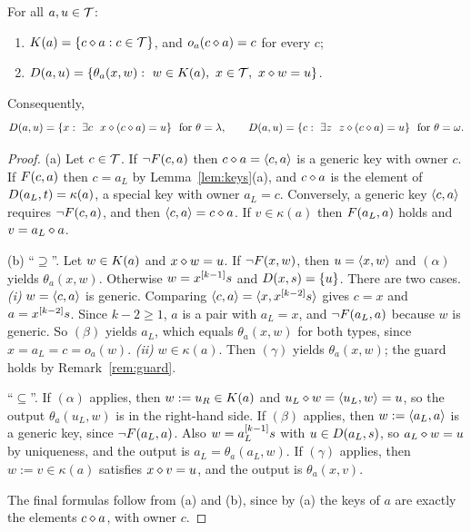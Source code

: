 \begin{lemma}[Semantics]\label{lem:semantics}
For all $a,u\in\mathcal{T}$:
\begin{enumerate}[label=\textup{(\alph*)}]
\item $K(a)=\{c\mathbin{\diamond} a: c\in\mathcal{T}\}$, and $o_a(c\mathbin{\diamond} a)=c$ for every $c$;
\item $\Dec(a,u)=\{\theta_a(x,w):\ w\in\Key(a),\ x\in\T,\ x\op w=u\}$.
\end{enumerate}
Consequently,
\[
  \Dec(a,u)=\{x:\ \exists c\ \ x\op(c\op a)=u\}\ \text{ for } \theta=\lambda,
  \qquad
  \Dec(a,u)=\{c:\ \exists z\ \ z\op(c\op a)=u\}\ \text{ for } \theta=\omega .
\]
\end{lemma}

\begin{proof}
(a) Let $c\in\mathcal{T}$. If $\neg F(c,a)$ then $c\mathbin{\diamond} a=\langle c,a\rangle$ is a generic key
with owner $c$. If $F(c,a)$ then $c=a_L$ by Lemma~\ref{lem:keys}(a), and
$c\mathbin{\diamond} a$ is the element of $D(a_L,t)=\kappa(a)$, a special key with owner
$a_L=c$. Conversely, a generic key $\langle c,a\rangle$ requires $\neg F(c,a)$, and
then $\langle c,a\rangle=c\mathbin{\diamond} a$. If $v\in\kappa(a)$ then $F(a_L,a)$ holds and
$v=a_L\mathbin{\diamond} a$.

(b) ``$\supseteq$''. Let $w\in K(a)$ and $x\mathbin{\diamond} w=u$. If $\neg F(x,w)$, then
$u=\langle x,w\rangle$ and $(\alpha)$ yields $\theta_a(x,w)$. Otherwise
$w=x^{[k-1]}s$ and $D(x,s)=\{u\}$. There are two cases.
\emph{(i)} $w=\langle c,a\rangle$ is generic. Comparing $\langle c,a\rangle=\langle x,x^{[k-2]}s\rangle$
gives $c=x$ and $a=x^{[k-2]}s$. Since $k-2\ge1$, $a$ is a pair with
$a_L=x$, and $\neg F(a_L,a)$ because $w$ is generic. So $(\beta)$ yields
$a_L$, which equals $\theta_a(x,w)$ for both types, since $x=a_L=c=o_a(w)$.
\emph{(ii)} $w\in\kappa(a)$. Then $(\gamma)$ yields $\theta_a(x,w)$; the guard
holds by Remark~\ref{rem:guard}.

``$\subseteq$''. If $(\alpha)$ applies, then $w:=u_R\in K(a)$ and
$u_L\mathbin{\diamond} w=\langle u_L,w\rangle=u$, so the output $\theta_a(u_L,w)$ is in the right-hand
side. If $(\beta)$ applies, then $w:=\langle a_L,a\rangle$ is a generic key, since
$\neg F(a_L,a)$. Also $w=a_L^{[k-1]}s$ with $u\in D(a_L,s)$, so
$a_L\mathbin{\diamond} w=u$ by uniqueness, and the output is $a_L=\theta_a(a_L,w)$. If
$(\gamma)$ applies, then $w:=v\in\kappa(a)$ satisfies $x\mathbin{\diamond} v=u$, and the
output is $\theta_a(x,v)$.

The final formulas follow from (a) and (b), since by (a) the keys of $a$ are
exactly the elements $c\mathbin{\diamond} a$, with owner $c$.
\end{proof}

